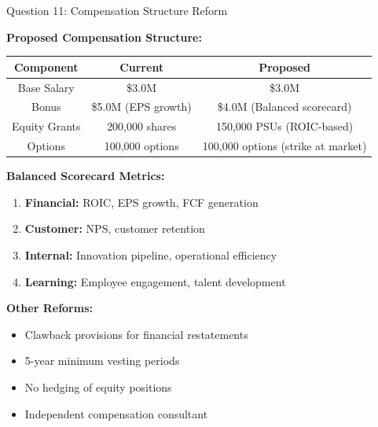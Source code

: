 \documentclass[aspectratio=169]{beamer}
\begin{document}
	\begin{frame}{Question 11: Compensation Structure Reform}
		
		\textbf{Proposed Compensation Structure:}
		
		\begin{table}[h]
			\centering
			\begin{tabular}{|c|c|c|}
				\hline
				\textbf{Component} & \textbf{Current} & \textbf{Proposed} \\
				\hline
				Base Salary & \$3.0M & \$3.0M \\
				Bonus & \$5.0M (EPS growth) & \$4.0M (Balanced scorecard) \\
				Equity Grants & 200,000 shares & 150,000 PSUs (ROIC-based) \\
				Options & 100,000 options & 100,000 options (strike at market) \\
				\hline
			\end{tabular}
		\end{table}
		
		\textbf{Balanced Scorecard Metrics:}
		\begin{enumerate}
			\item \textbf{Financial:} ROIC, EPS growth, FCF generation
			\item \textbf{Customer:} NPS, customer retention
			\item \textbf{Internal:} Innovation pipeline, operational efficiency
			\item \textbf{Learning:} Employee engagement, talent development
		\end{enumerate}
		
		\textbf{Other Reforms:}
		\begin{itemize}
			\item Clawback provisions for financial restatements
			\item 5-year minimum vesting periods
			\item No hedging of equity positions
			\item Independent compensation consultant
		\end{itemize}
	\end{frame}
	
\end{document}
